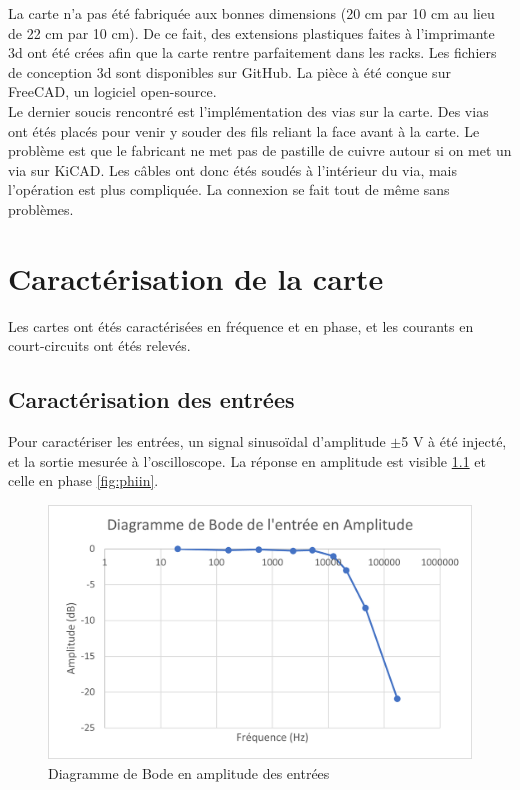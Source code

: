 \documentclass{report}
\begin{document}
La carte n'a pas été fabriquée aux bonnes dimensions (20 cm par 10 cm au lieu de 22 cm par 10 cm). De ce fait, des extensions plastiques faites à l'imprimante 3d ont été crées afin que la carte rentre parfaitement dans les racks. Les fichiers de conception 3d sont disponibles sur GitHub. La pièce à été conçue sur FreeCAD, un logiciel  open-source.\\

Le dernier soucis rencontré est l'implémentation des vias sur la carte. Des vias ont étés placés pour venir y souder des fils reliant la face avant à la carte. Le problème est que le fabricant ne met pas de pastille de cuivre autour si on met un via sur KiCAD. Les câbles ont donc étés soudés à l'intérieur du via, mais l'opération  est plus compliquée. La connexion se fait tout de même sans problèmes.

\chapter{Caractérisation de la carte}
\thispagestyle{empty}
Les cartes ont étés caractérisées en fréquence et en phase, et les courants en court-circuits ont étés relevés.
\section{Caractérisation des entrées}
Pour caractériser les entrées, un signal sinusoïdal d'amplitude $\pm$5 V à été injecté, et la sortie mesurée à l'oscilloscope.  La réponse en amplitude est visible  \ref{fig:ampin} et celle en phase  \ref{fig:phiin}.

\begin{figure}[h!]
\begin{center}
\includegraphics[scale=0.7]{IMAGES/amp_in.png} 
\end{center}
\caption{Diagramme de Bode en amplitude des entrées}
\label{fig:ampin}
\end{figure}
\end{document}
